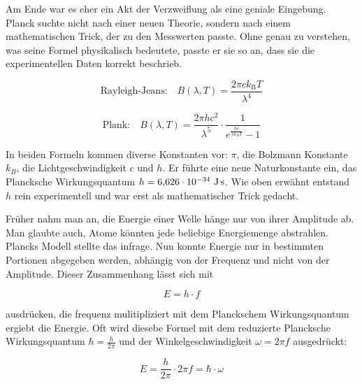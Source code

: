 	
	Am Ende war es eher ein Akt der Verzweiflung als eine geniale Eingebung. 
	Planck suchte nicht nach einer neuen Theorie, sondern nach einem mathematischen Trick, der zu den Messwerten passte.
	Ohne genau zu verstehen, was seine Formel physikalisch bedeutete, passte er sie so an, dass sie die experimentellen Daten korrekt beschrieb.


	\begin{equation}
		\text{Rayleigh-Jeans:} \quad B(\lambda, T) = \frac{2 \pi c k_\mathrm{B} T}{\lambda^4}
	\end{equation}

	\begin{equation}
		\text{Plank:} \quad B(\lambda, T) = \frac{2 \pi h c^2}{\lambda^5} \cdot \frac{1}{e^{\frac{h c}{\lambda k_B T}} - 1}
	\end{equation}
	



	In beiden Formeln kommen diverse Konstanten vor: $\pi$, die Bolzmann Konstante $k_B$, die Lichtgeschwindigkeit $c$ und $h$. 
	Er führte eine neue Naturkonstante ein, das Plancksche Wirkungsquantum $h = 6{,}626 \cdot 10^{-34} \ \text{J\,s}$. 
	Wie oben erwähnt entstand $h$ rein experimentell und war erst als mathematischer Trick gedacht. 
	
	
	Früher nahm man an, die Energie einer Welle hänge nur von ihrer Amplitude ab. 
	Man glaubte auch, Atome könnten jede beliebige Energiemenge abstrahlen. 
	Plancks Modell stellte das infrage. 
	Nun konnte Energie nur in bestimmten Portionen abgegeben werden, abhängig von der Frequenz und nicht von der Amplitude. 
	Dieser Zusammenhang lässt sich mit  
	
	\begin{equation}
		E = h \cdot f
	\end{equation}
	
	 ausdrücken, die frequenz mulitipliziert mit dem Planckschem Wirkungsquantum ergiebt die Energie.
	 Oft wird diesebe Formel mit dem reduzierte Plancksche Wirkungsquantum $\hbar = \frac{h}{2\pi}$ und der Winkelgeschwindigkeit $\omega = 2 \pi f$ ausgedrückt:
	 
	 \begin{equation}
	  	E = \frac{h}{2\pi} \cdot 2\pi f = \hbar \cdot \omega
	 \end{equation}
	 
